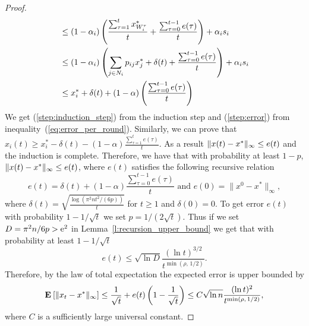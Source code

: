 \begin{proof}
\begin{align}
    &\leq
    (1-\alpha_i)
    \left(
    \frac{\sum_{\tau=1}^{t}x^*_{W_i^{\tau}}}{t}+
    \frac{\sum_{\tau=0}^{t-1} e(\tau)}{t}
    \right)
    + \alpha_i s_i \nonumber\\
    &\leq
    (1-\alpha_i)\left(\sum_{j \in N_i} p_{ij} x^*_{j} +
    \delta(t) + \frac{\sum_{\tau=0}^{t-1} e(\tau)}{t} \right) +
    \alpha_i s_i \label{step:error} \\
    &\leq
    x_i^* + \delta(t) + (1-\alpha)
    \left(
    \frac{\sum_{\tau=0}^{t-1} e(\tau)}{t}
    \right)
    \nonumber
  \end{align}
  We get (\ref{step:induction_step}) from the induction step and
  (\ref{step:error}) from inequality~(\ref{eq:error_per_round}).
  Similarly, we can prove that
  $x_i(t) \geq x_i^* - \delta(t) - (1-\alpha)
  \frac{\sum_{\tau=1}^t e(\tau)}{t}$.
  As a result $\| x(t)-x^* \|_{\infty} \leq e(t)$ and the induction
  is complete.  Therefore, we have that with probability at least $1-p$,
  \(\| x(t) - x^* \|_{\infty} \leq e(t)\), where $e(t)$ satisfies the
  following recursive relation
  \[
    e(t) =
    \delta(t) + (1-\alpha)\frac{\sum_{\tau=0}^{t-1}e(\tau)}{t}
    \text{ and } e(0)=\|x^0 - x^*\|_{\infty},
  \]
  where $\delta(t) = \sqrt{ \frac{\log(\pi^2 n t^2/(6 p))}{t}}$ for $t\geq 1$
  and $\delta(0) = 0$.
  To get error $e(t)$ with probability $1-1/\sqrt{t}$ we set
  $p = 1/(2\sqrt{t})$.
  Thus if we set $D = \pi^2 n /6p > \mathrm{e}^2$ in
  Lemma~\ref{l:recursion_upper_bound} we get that with probability at least
  $1-1/\sqrt{t}$
  \[
    e(t) \leq
    \sqrt{\ln D} \frac{(\ln t)^{3/2}}{t^{\min(\rho,\, 1/2)}}.
  \]
  Therefore, by the law of total expectation the expected error is upper
  bounded by
  \[
    \Exp{\norm{\infty}{x_t - x^*}} \leq \frac{1}{\sqrt{t}} + e(t) \lp( 1 -\frac{1}{\sqrt{t}} \rp)
    \leq C \sqrt{\ln n} \frac{(\ln t)^{2}}{t^{\min(\rho,\, 1/2)}},
  \]
  where $C$ is a sufficiently large universal constant.

\end{proof}
